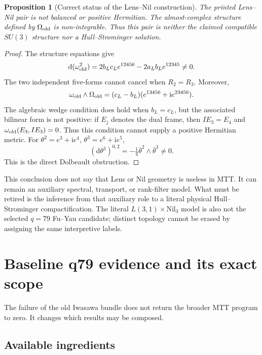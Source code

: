 \documentclass[11pt]{article}
\newcommand{\ii}{\mathrm{i}}
\newcommand{\dd}{\mathrm{d}}
\newtheorem{proposition}[theorem]{Proposition}
\theoremstyle{definition}
\theoremstyle{remark}
\begin{document}
\begin{proposition}[Correct status of the Lens--Nil construction]
The printed Lens--Nil pair is not balanced or positive Hermitian.  The almost-complex
structure defined by \(\Omega_{\rm old}\) is non-integrable.  Thus this
pair is neither the claimed compatible \(SU(3)\) structure nor a
Hull--Strominger solution.
\end{proposition}

\begin{proof}
The structure equations give
\[
 \dd(\omega_{\rm old}^2)
   =2b_Lc_L e^{12456}-2a_Lb_L e^{12345}\neq0.
\]
The two independent five-forms cannot cancel when \(R_2=R_3\).
Moreover,
\[
 \omega_{\rm old}\wedge\Omega_{\rm old}
 =(c_L-b_L)(e^{13456}+\ii e^{23456}).
\]
The algebraic wedge condition does hold when \(b_L=c_L\), but the
associated bilinear form is not positive: if \(E_j\) denotes the dual
frame, then \(I E_3=E_4\) and
\(\omega_{\rm old}(E_3,I E_3)=0\).  Thus this condition cannot supply
a positive Hermitian metric.
For \(\theta^2=e^3+\ii e^4\), \(\theta^3=e^6+\ii e^5\),
\[
 (\dd\theta^3)^{0,2}=-\tfrac14\bar\theta^2\wedge\bar\theta^3\neq0.
\]
This is the direct Dolbeault obstruction.
\end{proof}

This conclusion does not say that Lens or Nil geometry is useless in MTT.
It can remain an auxiliary spectral, transport, or rank-filter model.  What
must be retired is the inference from that auxiliary role to a literal
physical Hull--Strominger compactification.  The literal
\(L(3,1)\times\mathrm{Nil}_3\) model is also not the selected \(q=79\)
Fu--Yau candidate; distinct topology cannot be erased by assigning the same
interpretive labels.

\section{Baseline q79 evidence and its exact scope}
\label{sec:q79}

The failure of the old Iwasawa bundle does not return the broader MTT program
to zero.  It changes which results may be composed.

\subsection{Available ingredients}
\end{document}
